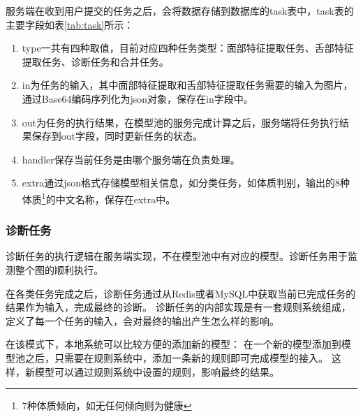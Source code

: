 服务端在收到用户提交的任务之后，会将数据存储到数据库的task表中，task表的主要字段如表\ref{tab:task}所示：
\begin{enumerate}
    
    \item type一共有四种取值，目前对应四种任务类型：面部特征提取任务、舌部特征提取任务、诊断任务和合并任务。

    \item in为任务的输入，其中面部特征提取和舌部特征提取任务需要的输入为图片，通过Base64编码序列化为json对象，保存在in字段中。

    \item out为任务的执行结果，在模型池的服务完成计算之后，服务端将任务执行结果保存到out字段，同时更新任务的状态。

    \item  handler保存当前任务是由哪个服务端在负责处理。

    \item extra通过json格式存储模型相关信息，如分类任务，如体质判别，输出的8种体质\footnote{7种体质倾向，如无任何倾向则为健康}的中文名称，保存在extra中。
\end{enumerate}

\subsubsection{诊断任务}


诊断任务的执行逻辑在服务端实现，不在模型池中有对应的模型。诊断任务用于监测整个图的顺利执行。

在各类任务完成之后，诊断任务通过从Redis或者MySQL中获取当前已完成任务的结果作为输入，完成最终的诊断。 
诊断任务的内部实现是有一套规则系统组成，定义了每一个任务的输入，会对最终的输出产生怎么样的影响。

在该模式下，本地系统可以比较方便的添加新的模型： 在一个新的模型添加到模型池之后，只需要在规则系统中，添加一条新的规则即可完成模型的接入。
这样，新模型可以通过规则系统中设置的规则，影响最终的结果。

